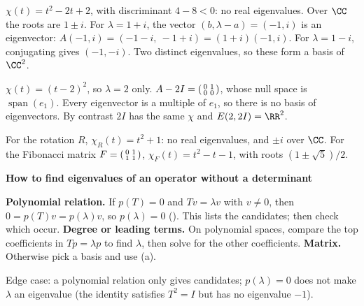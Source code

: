 \documentclass[10pt]{scrartcl}
\DeclareMathOperator{\spn}{span}\DeclareMathOperator{\nul}{null}\DeclareMathOperator{\range}{range}
\newenvironment{methodbox}[1]{\begin{mdframed}[style=methodstyle]\textbf{\color{NavyBlue}#1}\par\vspace{2pt}}{\end{mdframed}}
\begin{document}
\begin{example*}
  $\chi(t)=t^2-2t+2$, with discriminant $4-8<0$: no real eigenvalues. Over $\CC$ the roots are $1\pm i$. For $\lambda=1+i$, the vector $(b,\lambda-a)=(-1,i)$ is an eigenvector: $A(-1,i)=(-1-i,\ -1+i)=(1+i)(-1,i)$. For $\lambda=1-i$, conjugating gives $(-1,-i)$. Two distinct eigenvalues, so these form a basis of $\CC^2$.
\end{example*}

\begin{example*}
  $\chi(t)=(t-2)^2$, so $\lambda=2$ only. $A-2I=\begin{psmallmatrix}0&1\\0&0\end{psmallmatrix}$, whose null space is $\spn(e_1)$. Every eigenvector is a multiple of $e_1$, so there is no basis of eigenvectors. By contrast $2I$ has the same $\chi$ and $E(2,2I)=\RR^2$.
\end{example*}

\begin{example*}
  For the rotation $R$, $\chi_R(t)=t^2+1$: no real eigenvalues, and $\pm i$ over $\CC$. For the Fibonacci matrix $F=\begin{psmallmatrix}0&1\\1&1\end{psmallmatrix}$, $\chi_F(t)=t^2-t-1$, with roots $(1\pm\sqrt5)/2$.
\end{example*}

\begin{methodbox}{How to find eigenvalues of an operator without a determinant}
  \begin{steps}
    \ii \textbf{Polynomial relation.} If $p(T)=0$ and $Tv=\lambda v$ with $v\ne0$, then $0=p(T)v=p(\lambda)v$, so $p(\lambda)=0$ (). This lists the candidates; then check which occur.
    \ii \textbf{Degree or leading terms.} On polynomial spaces, compare the top coefficients in $Tp=\lambda p$ to find $\lambda$, then solve for the other coefficients.
    \ii \textbf{Matrix.} Otherwise pick a basis and use (a).
  \end{steps}
  Edge case: a polynomial relation only gives candidates; $p(\lambda)=0$ does not make $\lambda$ an eigenvalue (the identity satisfies $T^2=I$ but has no eigenvalue $-1$).
\end{methodbox}
\end{document}
